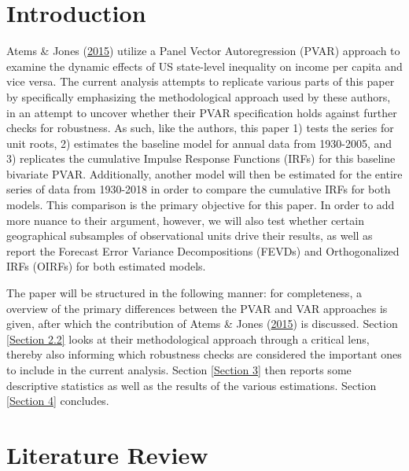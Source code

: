 \documentclass[11pt,preprint, authoryear]{elsarticle}
\numberwithin{equation}{section}
\numberwithin{figure}{section}
\numberwithin{table}{section}
\begin{document}
\headsep 35pt %




\hypertarget{introduction}{%
\section{\texorpdfstring{Introduction
\label{Introduction}}{Introduction }}\label{introduction}}

Atems \& Jones (\protect\hyperlink{ref-atems}{2015}) utilize a Panel
Vector Autoregression (PVAR) approach to examine the dynamic effects of
US state-level inequality on income per capita and vice versa. The
current analysis attempts to replicate various parts of this paper by
specifically emphasizing the methodological approach used by these
authors, in an attempt to uncover whether their PVAR specification holds
against further checks for robustness. As such, like the authors, this
paper 1) tests the series for unit roots, 2) estimates the baseline
model for annual data from 1930-2005, and 3) replicates the cumulative
Impulse Response Functions (IRFs) for this baseline bivariate PVAR.
Additionally, another model will then be estimated for the entire series
of data from 1930-2018 in order to compare the cumulative IRFs for both
models. This comparison is the primary objective for this paper. In
order to add more nuance to their argument, however, we will also test
whether certain geographical subsamples of observational units drive
their results, as well as report the Forecast Error Variance
Decompositions (FEVDs) and Orthogonalized IRFs (OIRFs) for both
estimated models.

The paper will be structured in the following manner: for completeness,
a overview of the primary differences between the PVAR and VAR
approaches is given, after which the contribution of Atems \& Jones
(\protect\hyperlink{ref-atems}{2015}) is discussed. Section
\ref{Section 2.2} looks at their methodological approach through a
critical lens, thereby also informing which robustness checks are
considered the important ones to include in the current analysis.
Section \ref{Section 3} then reports some descriptive statistics as well
as the results of the various estimations. Section \ref{Section 4}
concludes.

\hypertarget{literature-review}{%
\section{\texorpdfstring{Literature Review
\label{Section 2}}{Literature Review }}\label{literature-review}}
\end{document}
